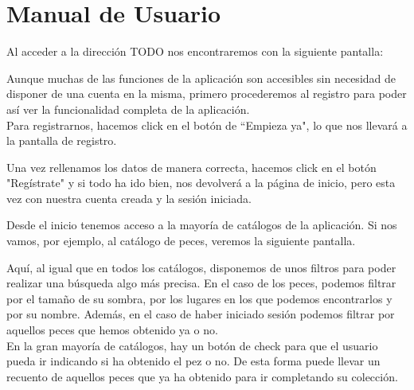 \chapter{Manual de Usuario}\label{manual}

Al acceder a la dirección TODO nos encontraremos con la siguiente pantalla:\\


Aunque muchas de las funciones de la aplicación son accesibles sin necesidad de disponer de una cuenta en la misma, primero procederemos al registro para poder así ver la funcionalidad completa de la aplicación.\\

Para registrarnos, hacemos click en el botón de ``Empieza ya", lo que nos llevará a la pantalla de registro.\\


Una vez rellenamos los datos de manera correcta, hacemos click en el botón "Regístrate" y si todo ha ido bien, nos devolverá a la página de inicio, pero esta vez con nuestra cuenta creada y la sesión iniciada.\\


Desde el inicio tenemos acceso a la mayoría de catálogos de la aplicación. Si nos vamos, por ejemplo, al catálogo de peces, veremos la siguiente pantalla.\\


Aquí, al igual que en todos los catálogos, disponemos de unos filtros para poder realizar una búsqueda algo más precisa. En el caso de los peces, podemos filtrar por el tamaño de su sombra, por los lugares en los que podemos encontrarlos y por su nombre. Además, en el caso de haber iniciado sesión podemos filtrar por aquellos peces que hemos obtenido ya o no.\\

En la gran mayoría de catálogos, hay un botón de check para que el usuario pueda ir indicando si ha obtenido el pez o no. De esta forma puede llevar un recuento de aquellos peces que ya ha obtenido para ir completando su colección.\\

